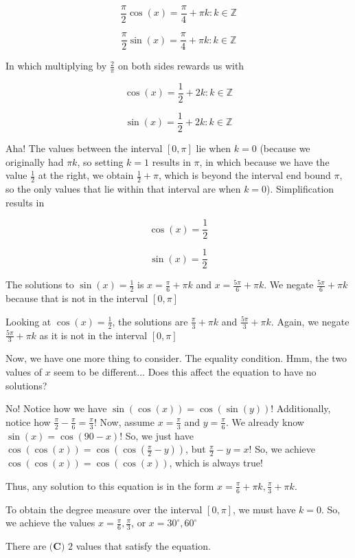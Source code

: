 \begin{enumerate}
 
 \[\frac{\pi}{2}\cos(x) = \frac{\pi}{4} + \pi k : k \in \mathbb{Z}\]

 \[\frac{\pi}{2}\sin(x) = \frac{\pi}{4} + \pi k : k \in \mathbb{Z}\]

 In which multiplying by $\frac{2}{\pi}$ on both sides rewards us with

 
 \[\cos(x) = \frac{1}{2} + 2k : k \in \mathbb{Z}\]

 \[\sin(x) = \frac{1}{2} + 2k : k \in \mathbb{Z}\]

 Aha! The values between the interval $[0,\pi]$ lie when $k=0$ (because we originally had $\pi k$, so setting $k = 1$ results in $\pi$, in which because we have the value $\frac{1}{2}$ at the right, we obtain $\frac{1}{2} + \pi$, which is beyond the interval end bound $\pi$, so the only values that lie within that interval are when $k=0$). Simplification results in

 
 \[\cos(x)=\frac{1}{2}\]

 \[\sin(x)=\frac{1}{2}\]

 The solutions to $\sin(x)=\frac{1}{2}$ is $x= \frac{\pi}{6} + \pi k$ and $x= \frac{5\pi}{6} + \pi k$. We negate $\frac{5\pi}{6} + \pi k$ because that is not in the interval $[0, \pi]$

 Looking at $\cos(x)=\frac{1}{2}$, the solutions are $\frac{\pi}{3} + \pi k$ and $\frac{5\pi}{3} + \pi k$. Again, we negate $\frac{5\pi}{3} + \pi k$ as it is not in the interval $[0,\pi]$

 Now, we have one more thing to consider. The equality condition. Hmm, the two values of $x$ seem to be different... Does this affect the equation to have no solutions?

 No! Notice how we have $\sin(\cos(x)) = \cos(\sin(y))$! Additionally, notice how $\frac{\pi}{2} - \frac{\pi}{6} = \frac{\pi}{3}$! Now, assume $x= \frac{\pi}{3}$ and $y=\frac{\pi}{6}$. We already know $\sin(x)=\cos(90-x)$! So, we just have $\cos(\cos(x))=\cos(\cos(\frac{\pi}{2}-y))$, but $\frac{\pi}{2}-y=x$! So, we achieve $\cos(\cos(x)) = \cos(\cos(x))$, which is always true!

 Thus, any solution to this equation is in the form $x= \frac{\pi}{6} + \pi k, \frac{\pi}{3} + \pi k$.

 To obtain the degree measure over the interval $[0,\pi]$, we must have $k=0$. So, we achieve the values $x=\frac{\pi}{6}, \frac{\pi}{3}$, or $x= 30^\circ, 60^\circ$

 There are $\boxed{\textbf{(C) }2}$ values that satisfy the equation.


\end{enumerate}

